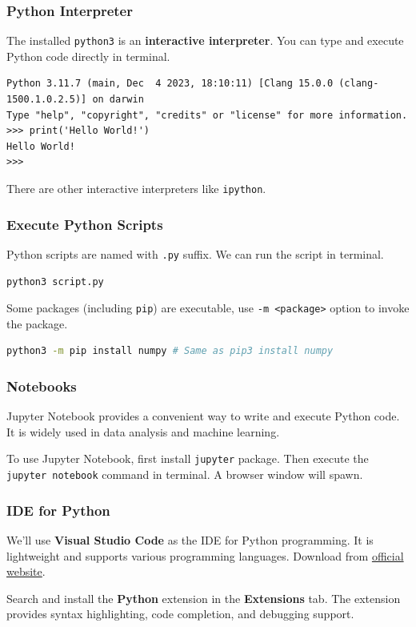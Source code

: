 \documentclass[beamer, en, version=2.0]{huangfusl-template}
\begin{document}
    \begin{frame}[fragile]
        \frametitle{Python Interpreter}

        The installed {\footnotesize\verb|python3|} is an \textbf{interactive interpreter}. You can type and execute Python code directly in terminal.

        \begin{lstlisting}[breaklines]
Python 3.11.7 (main, Dec  4 2023, 18:10:11) [Clang 15.0.0 (clang-1500.1.0.2.5)] on darwin
Type "help", "copyright", "credits" or "license" for more information.
>>> print('Hello World!')
Hello World!
>>>
        \end{lstlisting}

        There are other interactive interpreters like {\footnotesize\verb|ipython|}.
    \end{frame}
    \begin{frame}[fragile]
        \frametitle{Execute Python Scripts}

        Python scripts are named with {\footnotesize\verb|.py|} suffix. We can run the script in terminal.

        \begin{lstlisting}[language=bash]
python3 script.py
        \end{lstlisting}

        Some packages (including {\footnotesize\verb|pip|}) are executable, use {\footnotesize\verb|-m <package>|} option to invoke the package.

        \begin{lstlisting}[language=bash]
python3 -m pip install numpy # Same as pip3 install numpy
        \end{lstlisting}
    \end{frame}
    \begin{frame}[fragile]
        \frametitle{Notebooks}

        Jupyter Notebook provides a convenient way to write and execute Python code. It is widely used in data analysis and machine learning.

        To use Jupyter Notebook, first install {\footnotesize\verb|jupyter|} package. Then execute the {\footnotesize\verb|jupyter notebook|} command in terminal. A browser window will spawn.
    \end{frame}
    \begin{frame}
        \frametitle{IDE for Python}

        We'll use \textbf{Visual Studio Code} as the IDE for Python programming. It is lightweight and supports various programming languages. Download from \href{https://code.visualstudio.com/download}{\color{darkblue} official website}.

        Search and install the \textbf{Python} extension in the \textbf{Extensions} tab. The extension provides syntax highlighting, code completion, and debugging support.
    \end{frame}
\end{document}
